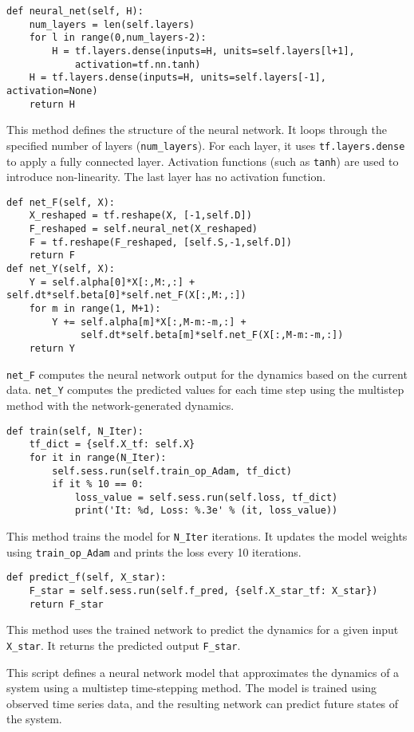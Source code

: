 \begin{verbatim}
def neural_net(self, H):
    num_layers = len(self.layers)
    for l in range(0,num_layers-2):
        H = tf.layers.dense(inputs=H, units=self.layers[l+1], 
            activation=tf.nn.tanh)
    H = tf.layers.dense(inputs=H, units=self.layers[-1], activation=None)
    return H
\end{verbatim}

This method defines the structure of the neural network. It loops through the specified number of layers (\texttt{num\_layers}). For each layer, it uses \texttt{tf.layers.dense} to apply a fully connected layer. Activation functions (such as \texttt{tanh}) are used to introduce non-linearity. The last layer has no activation function.

\begin{verbatim}
def net_F(self, X):
    X_reshaped = tf.reshape(X, [-1,self.D])
    F_reshaped = self.neural_net(X_reshaped)
    F = tf.reshape(F_reshaped, [self.S,-1,self.D])
    return F
def net_Y(self, X):
    Y = self.alpha[0]*X[:,M:,:] + self.dt*self.beta[0]*self.net_F(X[:,M:,:])
    for m in range(1, M+1):
        Y += self.alpha[m]*X[:,M-m:-m,:] +
             self.dt*self.beta[m]*self.net_F(X[:,M-m:-m,:])
    return Y
\end{verbatim}

\texttt{net\_F} computes the neural network output for the dynamics based on the current data. \texttt{net\_Y} computes the predicted values for each time step using the multistep method with the network-generated dynamics.

\begin{verbatim}
def train(self, N_Iter):
    tf_dict = {self.X_tf: self.X}
    for it in range(N_Iter):
        self.sess.run(self.train_op_Adam, tf_dict)
        if it % 10 == 0:
            loss_value = self.sess.run(self.loss, tf_dict)
            print('It: %d, Loss: %.3e' % (it, loss_value))
\end{verbatim}

This method trains the model for \texttt{N\_Iter} iterations. It updates the model weights using \texttt{train\_op\_Adam} and prints the loss every 10 iterations.

\begin{verbatim}
def predict_f(self, X_star):
    F_star = self.sess.run(self.f_pred, {self.X_star_tf: X_star})
    return F_star
\end{verbatim}

This method uses the trained network to predict the dynamics for a given input \texttt{X\_star}. It returns the predicted output \texttt{F\_star}.

This script defines a neural network model that approximates the dynamics of a system using a multistep time-stepping method. The model is trained using observed time series data, and the resulting network can predict future states of the system.
